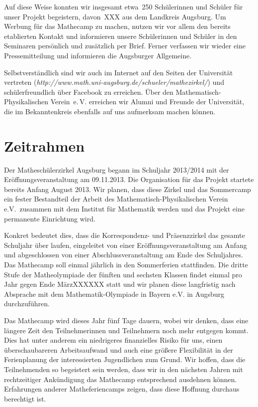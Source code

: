 \documentclass[12pt]{zettel}
\begin{document}
Auf diese Weise konnten wir insgesamt etwa~250 Schülerinnen und Schüler für
unser Projekt begeistern, davon~XXX aus dem Landkreis Augsburg. Um Werbung für
das Mathecamp zu machen, nutzen wir vor allem den bereits etablierten Kontakt
und informieren unsere Schülerinnen und Schüler in den Seminaren persönlich und
zusätzlich per Brief. Ferner verfassen wir wieder eine Pressemitteilung und
informieren die Augsburger Allgemeine.

Selbstverständlich sind wir auch im Internet auf den Seiten der Universität
vertreten (\textsl{http:/\!/www.math.uni-augsburg.de/schueler/mathezirkel/})
und schülerfreundlich über Facebook zu erreichen. Über den
Mathematisch-Physikalischen Verein~e.\,V. erreichen wir Alumni und Freunde der
Universität, die im Bekanntenkreis ebenfalls auf uns aufmerksam machen können.


\section{Zeitrahmen}

Der Matheschülerzirkel Augsburg begann im Schuljahr 2013/2014 mit der
Eröffnungsveranstaltung am 09.11.2013. Die Organisation für das Projekt
startete bereits Anfang August 2013. Wir planen, dass diese Zirkel und
das Sommercamp ein fester Bestandteil der Arbeit des
Mathematisch-Physikalischen Verein e.V.\ zusammen mit dem Institut für
Mathematik werden und das Projekt eine permanente Einrichtung wird.

Konkret bedeutet dies, dass die Korrespondenz- und Präsenzzirkel das
gesamte Schuljahr über laufen, eingeleitet von einer
Eröffnungsveranstaltung am Anfang und abgeschlossen von einer
Abschlussveranstaltung am Ende des Schuljahres. Das Mathecamp soll
einmal jährlich in den Sommerferien stattfinden. Die dritte Stufe der
Matheolympiade der fünften und sechsten Klassen findet einmal pro Jahr
gegen Ende MärzXXXXXX statt und wir planen diese langfristig nach
Absprache mit dem Mathematik-Olympiade in Bayern e.V. in Augsburg
durchzuführen.

Das Mathecamp wird dieses Jahr fünf Tage dauern, wobei wir denken, dass
eine längere Zeit den Teilnehmerinnen und Teilnehmern noch mehr entgegen
kommt. Dies hat unter anderem ein niedrigeres finanzielles Risiko für
uns, einen überschaubareren Arbeitsaufwand und auch eine größere
Flexibilität in der Ferienplanung der interessierten Jugendlichen zum
Grund. Wir hoffen, dass die Teilnehmenden so begeistert sein werden,
dass wir in den nächsten Jahren mit rechtzeitiger Ankündigung das
Mathecamp entsprechend ausdehnen können. Erfahrungen anderer
Matheferiencamps zeigen, dass diese Hoffnung durchaus berechtigt ist.
\end{document}
